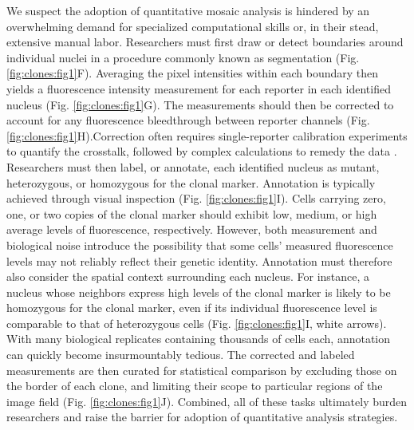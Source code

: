 We suspect the adoption of quantitative mosaic analysis is hindered by an overwhelming demand for specialized computational skills or, in their stead, extensive manual labor. Researchers must first draw or detect boundaries around individual nuclei in a procedure commonly known as segmentation (Fig. \ref{fig:clones:fig1}F). Averaging the pixel intensities within each boundary then yields a fluorescence intensity measurement for each reporter in each identified nucleus (Fig. \ref{fig:clones:fig1}G). The measurements should then be corrected to account for any fluorescence bleedthrough between reporter channels (Fig. \ref{fig:clones:fig1}H).Correction often requires single-reporter calibration experiments to quantify the crosstalk, followed by complex calculations to remedy the data \cite{Bacia2012,Elangovan2003}. Researchers must then label, or annotate, each identified nucleus as mutant, heterozygous, or homozygous for the clonal marker. Annotation is typically achieved through visual inspection (Fig. \ref{fig:clones:fig1}I). Cells carrying zero, one, or two copies of the clonal marker should exhibit low, medium, or high average levels of fluorescence, respectively. However, both measurement and biological noise introduce the possibility that some cells’ measured fluorescence levels may not reliably reflect their genetic identity. Annotation must therefore also consider the spatial context surrounding each nucleus. For instance, a nucleus whose neighbors express high levels of the clonal marker is likely to be homozygous for the clonal marker, even if its individual fluorescence level is comparable to that of heterozygous cells (Fig. \ref{fig:clones:fig1}I, white arrows). With many biological replicates containing thousands of cells each, annotation can quickly become insurmountably tedious. The corrected and labeled measurements are then curated for statistical comparison by excluding those on the border of each clone, and limiting their scope to particular regions of the image field (Fig. \ref{fig:clones:fig1}J). Combined, all of these tasks ultimately burden researchers and raise the barrier for adoption of quantitative analysis strategies. 

